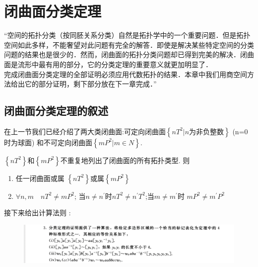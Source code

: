 \section{闭曲面分类定理}
“空间的拓扑分类（按同胚关系分类）自然是拓扑学中的一个重要问题．但是拓扑空间如此多样，不能奢望对此问题有完全的解答．即使是解决某些特定空间的分类问题的结果也是很少的．然而，闭曲面的拓扑分类问题却已得到完美的解决．闭曲面是流形中最有用的部分，它的分类定理的重要意义就更加明显了．\\
完成闭曲面分类定理的全部证明必须应用代数拓扑的结果．本章中我们用商空间方法给出它的部分证明，剩下部分放在下一章完成．”
\subsection*{闭曲面分类定理的叙述}
在上一节我们已经介绍了两大类闭曲面:可定向闭曲面\(\left\{nT^2| n\text{为非负整数} \right\} \) (n=0  时为球面) 和不可定向闭曲面\(\left\{mP^2 | m \in N \right\}\).
\begin{theorem}[闭曲面分类定理]
\(\left\{nT^2\right\}\)和\(\left\{mP^2\right\}\)不重复地列出了闭曲面的所有拓扑类型.
    则
    \begin{enumerate}
        \item 任一闭曲面或属 \(\left\{nT^2\right\}\)或属\(\left\{mP^2\right\}\) \\
        \item \(\forall n ,m \quad  nT^2 \neq mP^2\); 当\(n \neq n^{'}\)时\(nT^2 \neq n^{'}T^2\);当\(m \neq m^{'}\)时 \(m P^2 \neq m^{'} P^2\) \\
    \end{enumerate}
\end{theorem}
接下来给出计算法则 : 
\begin{figure}[H]
    \centering
    \includegraphics[width=1\linewidth]{image_17.png}
    
    
\end{figure}
